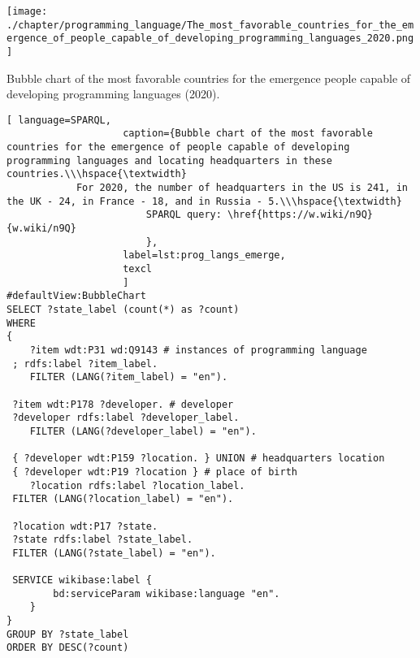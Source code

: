 \begin{marginfigure}[7cm]
	\texttt{[image: ./chapter/programming\_language/The\_most\_favorable\_countries\_for\_the\_emergence\_of\_people\_capable\_of\_developing\_programming\_languages\_2020.png]}
	\caption{Bubble chart of the most favorable countries for the emergence people capable of developing programming languages (2020).}
	\label{fig:emergence_2020}
\end{marginfigure}

\begin{lstlisting}[ language=SPARQL, 
                    caption={Bubble chart of the most favorable countries for the emergence of people capable of developing programming languages and locating headquarters in these countries.\\\hspace{\textwidth}
			For 2020, the number of headquarters in the US is 241, in the UK - 24, in France - 18, and in Russia - 5.\\\hspace{\textwidth}
                        SPARQL query: \href{https://w.wiki/n9Q}{w.wiki/n9Q}
                        },
                    label=lst:prog_langs_emerge,
                    texcl 
                    ]
#defaultView:BubbleChart
SELECT ?state_label (count(*) as ?count)
WHERE
{
 	?item wdt:P31 wd:Q9143 # instances of programming language
 ; rdfs:label ?item_label. 
 	FILTER (LANG(?item_label) = "en"). 
 
 ?item wdt:P178 ?developer. # developer
 ?developer rdfs:label ?developer_label. 
 	FILTER (LANG(?developer_label) = "en"). 
 		
 { ?developer wdt:P159 ?location. } UNION # headquarters location
 { ?developer wdt:P19 ?location } # place of birth
 	?location rdfs:label ?location_label. 
 FILTER (LANG(?location_label) = "en").
 
 ?location wdt:P17 ?state.
 ?state rdfs:label ?state_label. 
 FILTER (LANG(?state_label) = "en").

 SERVICE wikibase:label {
		bd:serviceParam wikibase:language "en".
	} 	
}
GROUP BY ?state_label
ORDER BY DESC(?count)
\end{lstlisting}%


